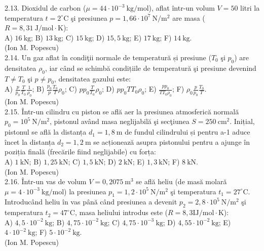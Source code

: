 2.13. Dioxidul de carbon ($\mu=44 \cdot 10^{-3} \mathrm{~kg} / \mathrm{mol}$), aflat într-un volum $V=50$ litri la temperatura $t=2^{\circ} \mathrm{C}$ şi presiunea $p=1,66 \cdot 10^{7} \mathrm{~N} / \mathrm{m}^{2}$ are masa ($R=8,31 \mathrm{~J} / \mathrm{mol} \cdot \mathrm{K}$):\\ A) $16 \mathrm{~kg}$; B) $13 \mathrm{~kg}$; C) $15 \mathrm{~kg}$; D) $15,5 \mathrm{~kg}$; E) $17 \mathrm{~kg}$; F) $14 \mathrm{~kg}$.\\ (Ion M. Popescu)\\

2.14. Un gaz aflat în condiţii normale de temperatură și presiune ($T_{0}$ şi $p_{0}$) are densitatea $\rho_{0}$, iar când se schimbă condițiile de temperatură şi presiune devenind $T \neq T_{0}$ şi $p \neq p_{0}$, densitatea gazului este:\\ A) $\frac{p}{p_{0}} \frac{T}{T_{0}} \frac{1}{\rho_{0}}$; B) $\frac{p_{0}}{p} \frac{T_{0}}{T} \rho_{0}$; C) $p p_{0} \frac{T}{T_{0}} \rho_{0}$; D) $p p_{0} T T_{0} \rho_{0}$; E) $\frac{p p_{0}}{T T_{0} \rho_{0}}$; F) $\rho_{0} \frac{p}{p_{0}} \frac{T_{0}}{T}$.\\ (Ion M. Popescu)\\

2.15. Într-un cilindru cu piston se află aer la presiunea atmosferică normală $p_{0}=10^{5} \mathrm{~N} / \mathrm{m}^{2}$, pistonul având masa neglijabilă şi secţiunea $S=250 \mathrm{~cm}^{2}$. Inițial, pistonul se află la distanța $d_{1}=1,8 \mathrm{~m}$ de fundul cilindrului și pentru a-1 aduce încet la distanța $d_{2}=1,2 \mathrm{~m}$ se acționează asupra pistonului pentru a ajunge în poziția finală (frecările fiind neglijabile) cu forța:\\ A) $1 \mathrm{~kN}$; B) $1,25 \mathrm{~kN}$; C) $1,5 \mathrm{~kN}$; D) $2 \mathrm{~kN}$; E) $1,3 \mathrm{~kN}$; F) $8 \mathrm{~kN}$.\\ (Ion M. Popescu)\\

2.16. Într-un vas de volum $V=0,2075 \mathrm{~m}^{3}$ se află heliu (de masă molară $\mu=4 \cdot 10^{-3} \mathrm{~kg} / \mathrm{mol}$) la presiunea $p_{1}=1,2 \cdot 10^{5} \mathrm{~N} / \mathrm{m}^{2}$ şi temperatura $t_{1}=27^{\circ} \mathrm{C}$. Introducând heliu în vas până când presiunea a devenit $p_{2}=2,8 \cdot 10^{5} \mathrm{~N} / \mathrm{m}^{2}$ şi temperatura $t_{2}=47^{\circ} \mathrm{C}$, masa heliului introdus este ($R=8,3 \mathrm{IJ} / \mathrm{mol} \cdot \mathrm{K}$):\\ A) $4,5 \cdot 10^{-2} \mathrm{~kg}$; B) $4,75 \cdot 10^{-2} \mathrm{~kg}$; C) $4,75 \cdot 10^{-3} \mathrm{~kg}$; D) $4,55 \cdot 10^{-2} \mathrm{~kg}$; E) $4 \cdot 10^{-2} \mathrm{~kg}$; F) $5 \cdot 10^{-2} \mathrm{~kg}$.\\ (Ion M. Popescu)\\

